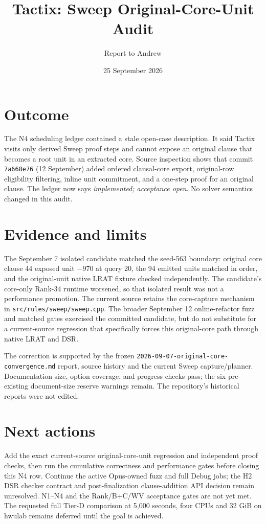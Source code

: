 \documentclass[11pt]{article}
\title{Tactix: Sweep Original-Core-Unit Audit}
\author{Report to Andrew}
\date{25 September 2026}
\begin{document}
\maketitle
\vspace{-1.5em}

\section*{Outcome}
The N4 scheduling ledger contained a stale open-case description. It said
Tactix visits only derived Sweep proof steps and cannot expose an original
clause that becomes a root unit in an extracted core. Source inspection shows
that commit \texttt{7a668e76} (12 September) added ordered clausal-core export,
original-row eligibility filtering, inline unit commitment, and a one-step
proof for an original clause. The ledger now says \emph{implemented;
acceptance open}. No solver semantics changed in this audit.

\section*{Evidence and limits}
The September 7 isolated candidate matched the seed-563 boundary: original
core clause 44 exposed unit $-970$ at query 20, the 94 emitted units matched
in order, and the original-unit native LRAT fixture checked independently.
The candidate's core-only Rank-34 runtime worsened, so that isolated result
was not a performance promotion. The current source retains the core-capture
mechanism in \texttt{src/rules/sweep/sweep.cpp}. The broader September 12
online-refactor fuzz and matched gates exercised the committed candidate,
but do not substitute for a current-source regression that specifically
forces this original-core path through native LRAT and DSR.

The correction is supported by the frozen
\texttt{2026-09-07-original-core-convergence.md} report, source history and
the current Sweep capture/planner. Documentation size, option coverage, and
progress checks pass; the six pre-existing document-size reserve warnings
remain. The repository's historical reports were not edited.

\section*{Next actions}
Add the exact current-source original-core-unit regression and independent
proof checks, then run the cumulative correctness and performance gates before
closing this N4 row. Continue the active Opus-owned fuzz and full Debug jobs;
the H2 DSR checker contract and post-finalization clause-addition API decision
remain unresolved. N1--N4 and the Rank/B+C/WV acceptance gates are not yet
met. The requested full Tier-D comparison at 5,000 seconds, four CPUs and
32 GiB on hwulab remains deferred until the goal is achieved.
\end{document}
